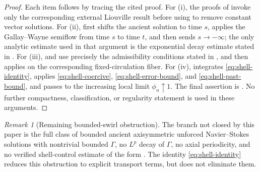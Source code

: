 \documentclass[11pt]{amsart}
\theoremstyle{plain}
\theoremstyle{definition}
\theoremstyle{remark}
\newtheorem{remark}[theorem]{Remark}
\numberwithin{equation}{section}
\begin{document}
\begin{proof}
Each item follows by tracing the cited proof.  For (i), the proofs of
 invoke only the
corresponding external Liouville result before using
 to remove constant vector solutions.  For (ii),
 first shifts the ancient solution to time
\(s\), applies the Gallay--Wayne semiflow from time \(s\) to time \(t\), and
then sends \(s\to-\infty\); the only analytic estimate used in that argument
is the exponential decay estimate stated in .  For (iii),  and
 use precisely the admissibility conditions
stated in , and  then applies
 on the corresponding fixed-circulation fiber.  For (iv),
 integrates \eqref{eq:shell-identity}, applies
\eqref{eq:shell-coercive}, \eqref{eq:shell-error-bound}, and
\eqref{eq:shell-past-bound}, and passes to the increasing local limit
\(\phi_n\uparrow1\).  The final assertion is
.  No further compactness, classification, or regularity
statement is used in these arguments.
\end{proof}

\begin{remark}[Remaining bounded-swirl obstruction]
The branch not closed by this paper is the full class of bounded ancient
axisymmetric unforced Navier--Stokes solutions with nontrivial bounded
\(\Gamma\), no \(L^p\) decay of \(\Gamma\), no axial periodicity, and no
verified shell-control estimate of the form .  The
identity \eqref{eq:shell-identity} reduces this obstruction to explicit
transport terms, but does not eliminate them.
\end{remark}
\end{document}

